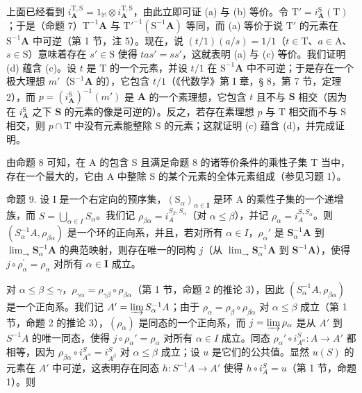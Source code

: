 上面已经看到 \(i_{\mathbf{A}}^{\mathrm{T},\mathrm{S}} = 1_{\mathbb{M}} \otimes i_{\mathbf{A}}^{\mathrm{T},\mathrm{S}}\)，由此立即可证 (a) 与 (b) 等价。令 \(\mathrm{T}' = i_{\mathbf{A}}^{\mathrm{S}}(\mathrm{T})\)；于是（命题 7）\(\mathrm{T}^{-1}\mathbf{A}\) 与 \(\mathrm{T}'^{-1}(\mathrm{S}^{-1}\mathbf{A})\) 等同，而 (a) 等价于说 \(\mathrm{T}'\) 的元素在 \(\mathrm{S}^{-1}\mathbf{A}\) 中可逆（第 1 节，注 5）。现在，说 \((t/1)(a/s) = 1/1\)（\(t \in \mathrm{T}\)、\(a \in \mathrm{A}\)、\(s \in \mathrm{S}\)）意味着存在 \(s' \in \mathrm{S}\) 使得 \(tas' = ss'\)，这就表明 (a) 与 (c) 等价。我们证明 (d) 蕴含 (c)。设 \(t\) 是 \(\mathrm{T}\) 的一个元素，并设 \(t/1\) 在 \(\mathrm{S}^{-1}\mathbf{A}\) 中不可逆；于是存在一个极大理想 \(m'\)（\(\mathrm{S}^{-1}\mathbf{A}\) 的），它包含 \(t/1\)（《代数学》第 I 章，§ 8，第 7 节，定理 2），而 \(p = (i_{\mathbf{A}}^{\mathrm{S}})^{-1}(m')\) 是 \(\mathbf{A}\) 的一个素理想，它包含 \(t\) 且不与 \(\mathbf{S}\) 相交（因为在 \(i_{\mathbf{A}}^{\mathrm{S}}\) 之下 \(\mathbf{S}\) 的元素的像是可逆的）。反之，若存在素理想 \(p\) 与 \(\mathrm{T}\) 相交而不与 \(\mathrm{S}\) 相交，则 \(p \cap \mathrm{T}\) 中没有元素能整除 \(\mathrm{S}\) 的元素；这就证明 (c) 蕴含 (d)，并完成证明。

由命题 8 可知，在 A 的包含 S 且满足命题 8 的诸等价条件的乘性子集 T 当中，存在一个最大的，它由 A 中整除 S 的某个元素的全体元素组成（参见习题 1）。

命题 9. 设 I 是一个右定向的预序集，\((\mathrm{S}_{\alpha})_{\alpha \in \mathbf{I}}\) 是环 A 的乘性子集的一个递增族，而 \(S = \bigcup_{\alpha \in I} S_{\alpha}\)。我们记 \(\rho_{\beta \alpha} = i_{A}^{S_{\beta}, S_{\alpha}}\)（对 \(\alpha \leqslant \beta\)），并记 \(\rho_{\alpha} = i_{A}^{S, S_{\alpha}}\)。则 \((S_{\alpha}^{-1}A, \rho_{\beta \alpha})\) 是一个环的正向系，并且，若对所有 \(\alpha \in I\)，\(\rho_{\alpha}'\) 是 \(\mathbf{S}_{\alpha}^{-1}\mathbf{A}\) 到 \(\lim_{\longrightarrow}\mathbf{S}_{\alpha}^{-1}\mathbf{A}\) 的典范映射，则存在唯一的同构 \(j\)（从 \(\lim_{\longrightarrow}\mathbf{S}_{\alpha}^{-1}\mathbf{A}\) 到 \(\mathbf{S}^{-1}\mathbf{A}\)），使得 \(j\circ \rho_{\alpha}^{\prime} = \rho_{\alpha}\) 对所有 \(\alpha \in \mathbf{I}\) 成立。

对 \(\alpha \leqslant \beta \leqslant \gamma\)，\(\rho_{\gamma \alpha} = \rho_{\gamma \beta} \circ \rho_{\beta \alpha}\)（第 1 节，命题 2 的推论 3），因此 \((S_{\alpha}^{-1}A, \rho_{\beta \alpha})\) 是一个正向系。我们记 \(A' = \varinjlim S_{\alpha}^{-1}A\)；由于 \(\rho_{\alpha} = \rho_{\beta} \circ \rho_{\beta \alpha}\) 对 \(\alpha \leqslant \beta\) 成立（第 1 节，命题 2 的推论 3），\((\rho_{\alpha})\) 是同态的一个正向系，而 \(j = \varinjlim \rho_{\alpha}\) 是从 \(A'\) 到 \(S^{-1}A\) 的唯一同态，使得 \(j \circ \rho_{\alpha}' = \rho_{\alpha}\) 对所有 \(\alpha \in I\) 成立。同态 \(\rho_{\alpha}' \circ i_{A^{\alpha}}^{S}: A \to A'\) 都相等，因为 \(\rho_{\beta \alpha} \circ i_{A^{\alpha}}^{S} = i_{A^{\beta}}^{S}\) 对 \(\alpha \leqslant \beta\) 成立；设 \(u\) 是它们的公共值。显然 \(u(S)\) 的元素在 \(A'\) 中可逆，这表明存在同态 \(h: S^{-1}A \to A'\) 使得 \(h \circ i_{A}^{S} = u\)（第 1 节，命题 1）。则

